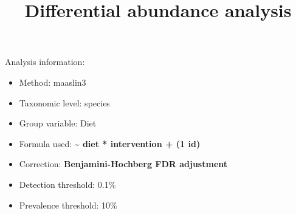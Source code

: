 \documentclass[
]{article}
\title{Differential abundance analysis}
\author{}
\date{}
\providecommand{\tightlist}{%
  \setlength{\itemsep}{0pt}\setlength{\parskip}{0pt}}\usepackage{longtable,booktabs,array}
\begin{document}
\maketitle


Analysis information:

\begin{itemize}
\tightlist
\item
  Method: maaslin3
\item
  Taxonomic level: species
\item
  Group variable: Diet
\item
  Formula used: \textbf{\textasciitilde{} diet * intervention + (1
  \textbar{} id)}
\item
  Correction: \textbf{Benjamini-Hochberg FDR adjustment}
\item
  Detection threshold: 0.1\%
\item
  Prevalence threshold: 10\%
\end{itemize}
\end{document}
